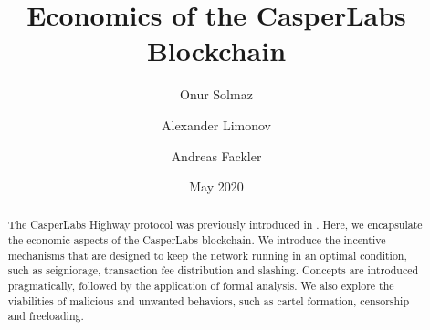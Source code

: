 \documentclass[12pt]{article}
\title{Economics of the CasperLabs Blockchain}
\author{Onur Solmaz}
\author{Alexander Limonov}
\author{Andreas Fackler}
\affil{CasperLabs}
\date{May 2020}
\begin{document}
\maketitle

\begin{abstract}
  The CasperLabs Highway protocol was previously introduced in \cite{kane2019casperlabs}. Here, we encapsulate the economic aspects of the CasperLabs blockchain. We introduce the incentive mechanisms that are designed to keep the network running in an optimal condition, such as seigniorage, transaction fee distribution and slashing. Concepts are introduced pragmatically, followed by the application of formal analysis. We also explore the viabilities of malicious and unwanted behaviors, such as cartel formation, censorship and freeloading.
\end{abstract}

\tableofcontents
\pagebreak




\newpage

\printbibliography
\end{document}
